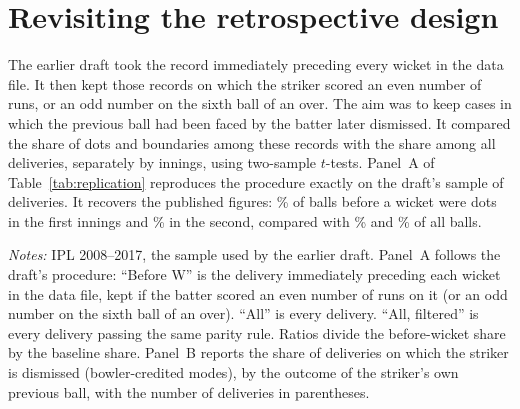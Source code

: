 \documentclass[11pt]{article}
\begin{document}
\section{Revisiting the retrospective design}\label{sec:replication}

The earlier draft took the record immediately preceding every wicket in the data file. It then kept those records on which the striker scored an even number of runs, or an odd number on the sixth ball of an over. The aim was to keep cases in which the previous ball had been faced by the batter later dismissed. It compared the share of dots and boundaries among these records with the share among all deliveries, separately by innings, using two-sample $t$-tests. Panel~A of Table~\ref{tab:replication} reproduces the procedure exactly on the draft's sample of \OrigDeliveries{} deliveries. It recovers the published figures: \OrigZeroOneBefore\% of balls before a wicket were dots in the first innings and \OrigZeroTwoBefore\% in the second, compared with \OrigZeroOneAll\% and \OrigZeroTwoAll\% of all balls.

\begin{table}[tbp]
\centering
\begin{threeparttable}
\caption{The retrospective comparison and the prospective hazard}\label{tab:replication}
\footnotesize
\setlength{\tabcolsep}{4pt}

\begin{tablenotes}[flushleft]\footnotesize
\item \emph{Notes:} IPL 2008--2017, the sample used by the earlier draft. Panel~A follows the draft's procedure: ``Before W'' is the delivery immediately preceding each wicket in the data file, kept if the batter scored an even number of runs on it (or an odd number on the sixth ball of an over). ``All'' is every delivery. ``All, filtered'' is every delivery passing the same parity rule. Ratios divide the before-wicket share by the baseline share. Panel~B reports the share of deliveries on which the striker is dismissed (bowler-credited modes), by the outcome of the striker's own previous ball, with the number of deliveries in parentheses.
\end{tablenotes}
\end{threeparttable}
\end{table}
\end{document}
